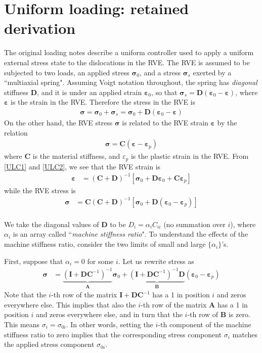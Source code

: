 \section{Uniform loading: retained derivation}\label{sec:legacycontroller}


The original loading notes describe a uniform controller used to apply a uniform external stress state to the dislocations in the RVE.  The RVE is assumed to be subjected to two loads, an applied stress $\bm \sigma_0$, and a stress $\bm \sigma_s$ exerted by a ``multiaxial spring". Assuming Voigt notation throughout, the spring has \emph{diagonal} stiffness $\bm D$, and it is under an applied strain $\bm \varepsilon_0$, so that $\bm \sigma_s=\bm D\left(\bm \varepsilon_0-\bm\varepsilon\right)$, where $\bm\varepsilon$ is the strain in the RVE. 
Therefore the stress in the RVE is
\begin{align}
\bm \sigma=\bm \sigma_0+\bm \sigma_s= \bm \sigma_0+\bm D\left(\bm \varepsilon_0-\bm\varepsilon\right)
\label{ULC1}
\end{align} 
On the other hand, the RVE stress $\bm \sigma$ is  related to the RVE strain $\bm \varepsilon$ by the relation
\begin{align}
\bm \sigma=\bm C\left(\bm \varepsilon-\bm\varepsilon_p\right)
\label{ULC2}
\end{align} 
where $\bm C$ is the material stiffness, and $\varepsilon_p$ is the plastic strain in the RVE. From \eqref{ULC1} and \eqref{ULC2}, we see that the RVE strain is
\begin{align}
\bm \varepsilon&=\left(\bm C+\bm D\right)^{-1} \left[\bm \sigma_0+\bm D\bm \varepsilon_0+\bm C\bm\varepsilon_p\right]
\end{align}
while the RVE stress is
\begin{align}
\bm \sigma&=\bm C\left(\bm C+\bm D\right)^{-1} \left[\bm \sigma_0+\bm D\left(\bm \varepsilon_0- \bm\varepsilon_p\right)\right]\nonumber\\
\end{align}

We take the diagonal values of $\bm D$ to be $D_i=\alpha_i C_{ii}$ (no summation over $i$), where $\alpha_i$ is an array called ``\emph{machine stiffness ratio}". To understand the effects of the machine stiffness ratio, consider the two limits of small and large $\{\alpha_i\}$'s.

First, suppose that $\alpha_i=0$ for some $i$. Let us rewrite stress as
\begin{align}
\bm \sigma&=\underbrace{\left(\bm I+\bm D\bm C^{-1}\right)^{-1}}_{\bm A}\bm \sigma_0+\underbrace{\left(\bm I+\bm D\bm C^{-1}\right)^{-1}\bm D}_{\bm B}\left(\bm \varepsilon_0- \bm\varepsilon_p\right)
\end{align}
 Note that the $i$-th row of the matrix $\bm I+\bm D\bm C^{-1}$ has a 1 in position $i$ and zeros everywhere else. This implies that also the $i$-th row of the matrix $\bm A$ has a 1 in position $i$ and zeros everywhere else, and in turn that  the $i$-th row of $\bm B$ is zero. This means $\sigma_{i}= \sigma_{0i}$. In other words, setting the $i$-th component of the machine stiffness ratio to zero implies that the corresponding stress component $\sigma_{i}$  matches the applied stress component $\sigma_{0i}$.


